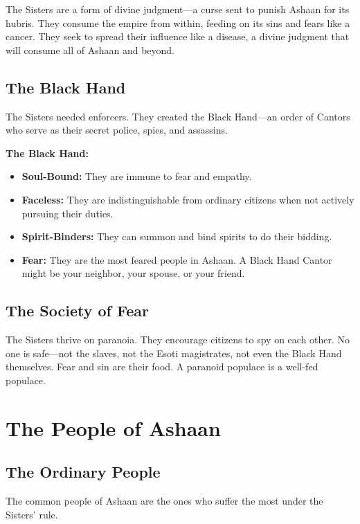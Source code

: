 \documentclass[11pt,twoside]{book}
\newenvironment{mechanicbox}{\begin{mdframed}[style=mechanicbox]}{\end{mdframed}}
\begin{document}
The Sisters are a form of divine judgment---a curse sent to punish Ashaan for its hubris. They consume the empire from within, feeding on its sins and fears like a cancer. They seek to spread their influence like a disease, a divine judgment that will consume all of Ashaan and beyond.

\section{The Black Hand}

The Sisters needed enforcers. They created the Black Hand---an order of Cantors who serve as their secret police, spies, and assassins.

\begin{mechanicbox}
\textbf{The Black Hand:}
\begin{itemize}
    \item \textbf{Soul-Bound:} They are immune to fear and empathy.
    \item \textbf{Faceless:} They are indistinguishable from ordinary citizens when not actively pursuing their duties.
    \item \textbf{Spirit-Binders:} They can summon and bind spirits to do their bidding.
    \item \textbf{Fear:} They are the most feared people in Ashaan. A Black Hand Cantor might be your neighbor, your spouse, or your friend.
\end{itemize}
\end{mechanicbox}

\section{The Society of Fear}

The Sisters thrive on paranoia. They encourage citizens to spy on each other. No one is safe---not the slaves, not the Esoti magistrates, not even the Black Hand themselves. Fear and sin are their food. A paranoid populace is a well-fed populace.

\chapter{The People of Ashaan}

\section{The Ordinary People}

The common people of Ashaan are the ones who suffer the most under the Sisters' rule.
\end{document}
